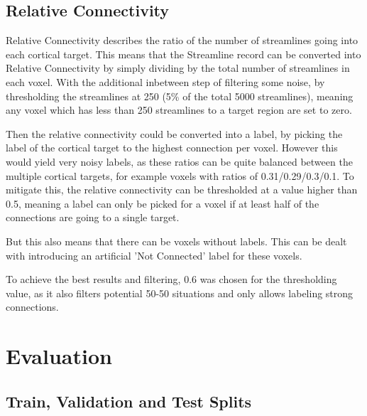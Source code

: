 \subsection{Relative Connectivity}
\label{sec:conpre}

Relative Connectivity describes the ratio of the number of streamlines going into each cortical target. This means that the Streamline record can be converted into Relative Connectivity by simply dividing by the total number of streamlines in each voxel. With the additional inbetween step of filtering some noise, by thresholding the streamlines at 250 (5\% of the total 5000 streamlines), meaning any voxel which has less than 250 streamlines to a target region are set to zero.\par
Then the relative connectivity could be converted into a label, by picking the label of the cortical target to the highest connection per voxel. However this would yield very noisy labels, as these ratios can be quite balanced between the multiple cortical targets, for example voxels with ratios of 0.31/0.29/0.3/0.1. To mitigate this, the relative connectivity can be thresholded at a value higher than 0.5, meaning a label can only be picked for a voxel if at least half of the connections are going to a single target.\par
But this also means that there can be voxels without labels. This can be dealt with introducing an artificial 'Not Connected' label for these voxels.\par
To achieve the best results and filtering, 0.6 was chosen for the thresholding value, as it also filters potential 50-50 situations and only allows labeling strong connections.

\section{Evaluation}

\subsection{Train, Validation and Test Splits}
\label{sec:travaltes}

